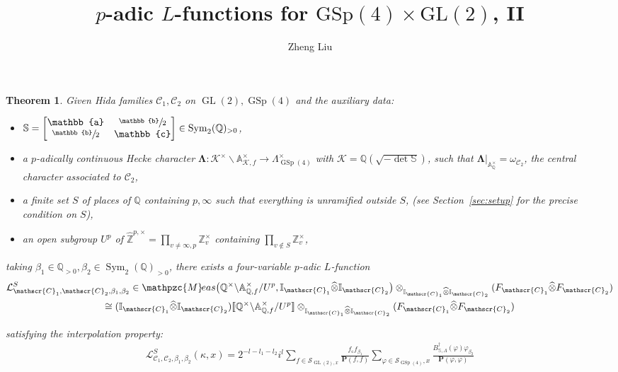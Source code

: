 \documentclass[10pt]{amsart}
\newcommand{\Lfunction}{$L$\nobreakdash-func\-tion\xspace}
\theoremstyle{plain}
\newtheorem{thmintro}{Theorem}[section]
\theoremstyle{remark}
\newcommand{\bA}{\mathbb{A}}
\newcommand{\bI}{\mathbb{I}}
\newcommand{\bQ}{\mathbb{Q}}
\newcommand{\bS}{\mathbb{S}}
\newcommand{\bZ}{\mathbb{Z}}
\newcommand{\bba}{\mathbb{a}}
\newcommand{\bbb}{\mathbb{b}}
\newcommand{\bbc}{\mathbb{c}}
\newcommand{\cK}{\mathcal{K}}
\newcommand{\cL}{\mathcal{L}}
\newcommand{\sC}{\mathscr{C}}
\newcommand{\sS}{\mathscr{S}}
\newcommand{\bfP}{\mathbf{P}}
\DeclareMathOperator{\GL}{GL}
\DeclareMathOperator{\GSp}{GSp}
\newcommand{\Meas}{\mathpzc{M}\mkern-2mu eas}
\DeclareMathOperator{\Sym}{Sym}
\let\wh\widehat
\let\bes B
\let\llb\llbracket
\let\rrb\rrbracket
\newcommand{\bLam}{\boldsymbol\Lambda}
\begin{document}
\title{$p$-adic $L$-functions for $\mathrm{GSp}(4)\times\mathrm{GL}(2)$, II}
\author{Zheng Liu}
\maketitle
\setcounter{section}{1}
\begin{thmintro}\label{thm:main}
Given Hida families $\sC_1,\sC_2$ on $\GL(2),\GSp(4)$ and the auxiliary data:
\begin{itemize}
\item
$\bS=\begin{bmatrix}\bba&\sfrac{\bbb}{2}\\ \sfrac{\bbb}{2}&\bbc\end{bmatrix}\in\Sym_2(\bQ)_{>0}$,
\item
a $p$-adically continuous Hecke character $\bLam:\cK^\times\backslash\bA^\times_{\cK,f}\to \Lambda^\times_{\GSp(4)}$ with $\cK=\bQ(\sqrt{-\det\bS})$, such that $\bLam|_{\bA^\times_\bQ}=\omega_{\sC_2}$, the central character associated to $\sC_2$,
\item
a finite set $S$ of places of $\bQ$ containing $p,\infty$ such that everything is unramified outside $S$, (see Section~\ref{sec:setup} for the precise condition on $S$),
\item
an open subgroup $U^p$ of $\hat{\bZ}^{p,\times}=\prod_{v\neq \infty,p} \bZ^\times_v$ containing $\prod_{v\notin S} \bZ^\times_v$,
\end{itemize}
taking $\beta_1\in\bQ_{>0},\beta_2\in\Sym_2(\bQ)_{>0}$, there exists a four-variable $p$-adic \Lfunction
\begin{multline*}
\cL^S_{\sC_1,\sC_2,\beta_1,\beta_2}\in\Meas\bigl(\bQ^\times\backslash\bA^\times_{\bQ,f}/U^p,\bI_{\sC_1}\wh{\otimes}\bI_{\sC_2}\bigr)\otimes_{\bI_{\sC_1}\wh{\otimes}\bI_{\sC_2}} (F_{\sC_1}\wh{\otimes}F_{\sC_2})\\
\cong (\bI_{\sC_1}\wh{\otimes}\bI_{\sC_2})\llb \bQ^\times\backslash\bA^\times_{\bQ,f}/U^p\rrb\otimes_{\bI_{\sC_1}\wh{\otimes}\bI_{\sC_2}} (F_{\sC_1}\wh{\otimes}F_{\sC_2})
\end{multline*}
\noindent
\begin{minipage}{\textwidth}
satisfying the interpolation property:
\begin{multline*}
\cL^S_{\sC_1,\sC_2,\beta_1,\beta_2}(\kappa,x)
=2^{-l-l_1-l_2}i^l\sum_{f\in \sS_{\GL(2),x}} \frac{f_{\bbc}f_{\beta_1}}{\bfP(f,f)}\sum_{\varphi\in \sS_{\GSp(4)},x} \frac{\bes^\dagger_{\bS,\Lambda}\left(\varphi\right)\varphi_{\beta_2}}{\bfP(\varphi,\varphi)} \\

\end{multline*}
\end{minipage}
\end{thmintro}
\end{document}
